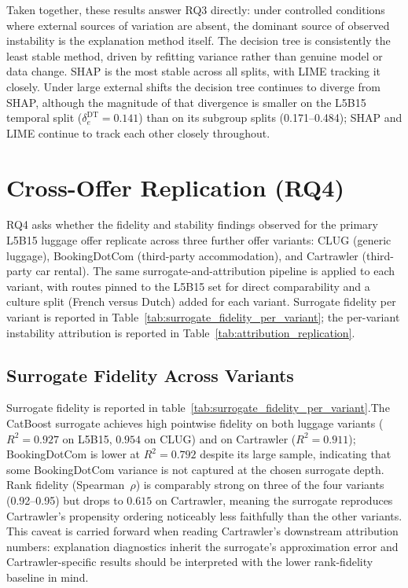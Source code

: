 \documentclass[oneside]{memoir} %
\begin{document}
Taken together, these results answer RQ3 directly: under controlled conditions where external sources of variation are absent, the dominant source of observed instability is the explanation method itself. The decision tree is consistently the least stable method, driven by refitting variance rather than genuine model or data change. SHAP is the most stable across all splits, with LIME tracking it closely. Under large external shifts the decision tree continues to diverge from SHAP, although the magnitude of that divergence is smaller on the L5B15 temporal split ($\delta_e^{\mathrm{DT}} = 0.141$) than on its subgroup splits (0.171--0.484); SHAP and LIME continue to track each other closely throughout.

\section{Cross-Offer Replication (RQ4)} \label{sec:rq4}

RQ4 asks whether the fidelity and stability findings observed for the primary L5B15 luggage offer replicate across three further offer variants: CLUG (generic luggage), BookingDotCom (third-party accommodation), and Cartrawler (third-party car rental). The same surrogate-and-attribution pipeline is applied to each variant, with routes pinned to the L5B15 set for direct comparability and a culture split (French versus Dutch) added for each variant. Surrogate fidelity per variant is reported in Table~\ref{tab:surrogate_fidelity_per_variant}; the per-variant instability attribution is reported in Table~\ref{tab:attribution_replication}.



\subsection{Surrogate Fidelity Across Variants}

Surrogate fidelity is reported in table~\ref{tab:surrogate_fidelity_per_variant}.The CatBoost surrogate achieves high pointwise fidelity on both luggage variants ($R^2 = 0.927$ on L5B15, $0.954$ on CLUG) and on Cartrawler ($R^2 = 0.911$); BookingDotCom is lower at $R^2 = 0.792$ despite its large sample, indicating that some BookingDotCom variance is not captured at the chosen surrogate depth. Rank fidelity (Spearman~$\rho$) is comparably strong on three of the four variants (0.92--0.95) but drops to $0.615$ on Cartrawler, meaning the surrogate reproduces Cartrawler's propensity ordering noticeably less faithfully than the other variants. This caveat is carried forward when reading Cartrawler's downstream attribution numbers: explanation diagnostics inherit the surrogate's approximation error and Cartrawler-specific results should be interpreted with the lower rank-fidelity baseline in mind.
\end{document}

